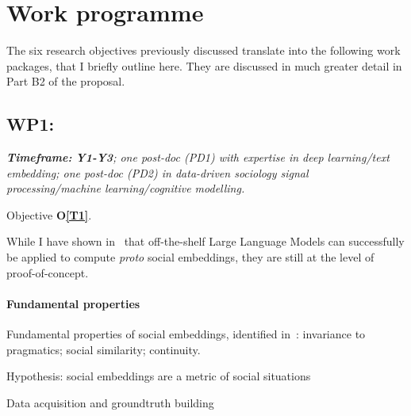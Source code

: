 
\section{Work programme}





The six research objectives previously discussed translate into the following
work packages, that I briefly outline here. They are discussed in much
greater detail in Part B2 of the proposal.

\subsection{WP1: \textbf{\wpOne}}
\emph{ \textbf{Timeframe:} \textbf{Y1-Y3}; one post-doc (PD1) with expertise in
    deep learning/text embedding; one post-doc (PD2) in data-driven sociology
signal processing/machine learning/cognitive modelling.}

Objective {\bf O\ref{T1}}.

While I have shown in~\cite{lemaignan2024social} that off-the-shelf Large
Language Models can successfully be applied to compute \emph{proto} social
embeddings, they are still at the level of proof-of-concept.


\paragraph{Fundamental properties}

Fundamental properties of social embeddings, identified
in~\cite{lemaignan2024social}: invariance to pragmatics; social similarity;
continuity.

Hypothesis: social embeddings are a metric of social situations

Data acquisition and groundtruth building

